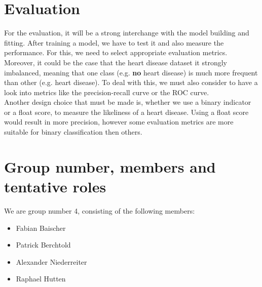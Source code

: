 \documentclass{article}
\begin{document}
\section{Evaluation}

For the evaluation, it will be a strong interchange with the model building and fitting. After training a model, we have to test it and also measure the performance. For this, we need to select appropriate evaluation metrics. Moreover, it could be the case that the heart disease dataset it strongly imbalanced, meaning that one class (e.g. \textbf{no} heart disease) is much more frequent than other (e.g. heart disease). To deal with this, we must also consider to have a look into metrics like the precision-recall curve or the ROC curve.\\
Another design choice that must be made is, whether we use a binary indicator or a float score, to measure the likeliness of a heart disease. Using a float score would result in more precision, however some evaluation metrics are more suitable for binary classification then others.

\section{Group number, members and tentative roles}

We are group number 4, consisting of the following members:
\begin{itemize}
    \item Fabian Baischer
    \item Patrick Berchtold
    \item Alexander Niederreiter
    \item Raphael Hutten
\end{itemize}
\end{document}
